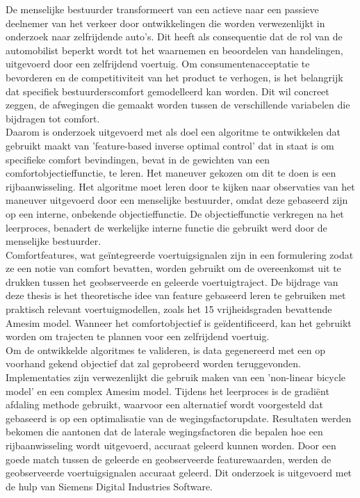 \documentclass[master=wtk,english]{kulemt}
\begin{document}
\begin{abstract*}
De menselijke bestuurder transformeert van een actieve naar een passieve deelnemer van het verkeer door ontwikkelingen die worden verwezenlijkt in onderzoek naar zelfrijdende auto's.  Dit heeft als consequentie dat de rol van de automobilist beperkt wordt tot het waarnemen en beoordelen van handelingen, uitgevoerd door een zelfrijdend voertuig.  Om consumentenacceptatie te bevorderen en de competitiviteit van het product te verhogen, is het belangrijk dat specifiek bestuurderscomfort gemodelleerd kan worden. Dit wil concreet zeggen, de afwegingen die gemaakt worden tussen de verschillende variabelen die bijdragen tot comfort.\\

Daarom is onderzoek uitgevoerd met als doel een algoritme te ontwikkelen dat gebruikt maakt van 'feature-based inverse optimal control' dat in staat is om specifieke comfort bevindingen, bevat in de gewichten van een comfortobjectieffunctie, te leren. Het maneuver gekozen om dit te doen is een rijbaanwisseling. Het algoritme moet leren door te kijken naar observaties van het maneuver uitgevoerd door een menselijke bestuurder, omdat deze gebaseerd zijn op een interne, onbekende objectieffunctie. De objectieffunctie verkregen na het leerproces, benadert de werkelijke interne functie die gebruikt werd door de menselijke bestuurder.\\ Comfortfeatures, wat ge{\"i}ntegreerde voertuigsignalen zijn in een formulering zodat ze een notie van comfort bevatten, worden gebruikt om de overeenkomst uit te drukken tussen het geobserveerde en geleerde voertuigtraject. De bijdrage van deze thesis is het theoretische idee van feature gebaseerd leren te gebruiken met praktisch relevant voertuigmodellen, zoals het 15 vrijheidsgraden bevattende Amesim model. Wanneer het comfortobjectief is ge{\"i}dentificeerd, kan het gebruikt worden om trajecten te plannen voor een zelfrijdend voertuig.\\

Om de ontwikkelde algoritmes te valideren, is data gegenereerd met een op voorhand gekend objectief dat zal geprobeerd worden teruggevonden. Implementaties zijn verwezenlijkt die gebruik maken van een 'non-linear bicycle model' en een complex Amesim model. Tijdens het leerproces is de gradi{\"e}nt afdaling methode gebruikt, waarvoor een alternatief wordt voorgesteld dat gebaseerd is op een optimalisatie van de wegingsfactorupdate.
Resultaten werden bekomen die aantonen dat de laterale wegingsfactoren die bepalen hoe een rijbaanwisseling wordt uitgevoerd, accuraat geleerd kunnen worden. Door een goede match tussen de geleerde en geobserveerde featurewaarden, werden de geobserveerde voertuigsignalen accuraat geleerd. Dit onderzoek is uitgevoerd met de hulp van Siemens Digital Industries Software.  




\end{abstract*}
\end{document}
